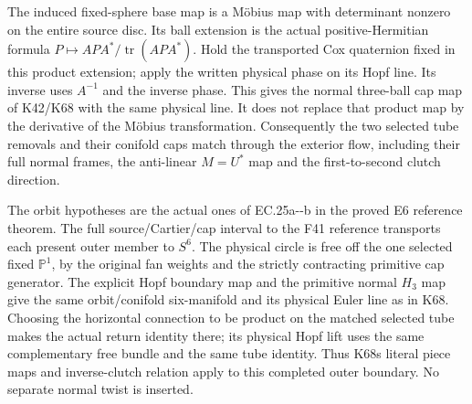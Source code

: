 The induced fixed-sphere base map is a Möbius map with determinant nonzero on the entire source disc. Its ball extension is the actual positive-Hermitian formula \(P\mapsto APA^*/\operatorname{tr}(APA^*)\). Hold the transported Cox quaternion fixed in this product extension; apply the written physical phase on its Hopf line. Its inverse uses \(A^{-1}\) and the inverse phase. This gives the normal three-ball cap map of K42/K68 with the same physical line. It does not replace that product map by the derivative of the Möbius transformation. Consequently the two selected tube removals and their conifold caps match through the exterior flow, including their full normal frames, the anti-linear \(M=U^*\) map and the first-to-second clutch direction.

The orbit hypotheses are the actual ones of EC.25a-\/-b in the proved E6 reference theorem. The full source/Cartier/cap interval to the F41 reference transports each present outer member to \(S^6\). The physical circle is free off the one selected fixed \(\mathbb P^1\), by the original fan weights and the strictly contracting primitive cap generator. The explicit Hopf boundary map and the primitive normal \(H_3\) map give the same orbit/conifold six-manifold and its physical Euler line as in K68. Choosing the horizontal connection to be product on the matched selected tube makes the actual return identity there; its physical Hopf lift uses the same complementary free bundle and the same tube identity. Thus K68\textquotesingle s literal piece maps and inverse-clutch relation apply to this completed outer boundary. No separate normal twist is inserted.

